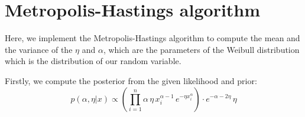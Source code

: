 \documentclass[9pt]{IEEEtran}
\begin{document}
\section{Metropolis-Hastings algorithm}
Here, we implement the Metropolis-Hastings algorithm to compute the mean and 
the variance of the $\eta$ and $\alpha$, which are the parameters of the Weibull 
distribution which is the distribution of our random variable. 

Firstly, we compute the posterior from the given likelihood and prior: 
\[
p(\alpha, \eta | x) \propto \left( \prod_{i=1}^{n} \alpha \, \eta \, x_i^{\alpha - 1} \, e^{-\eta x_i^\alpha} \right) \cdot e^{-\alpha - 2 \eta} \, \eta
\]




        
\end{document}
